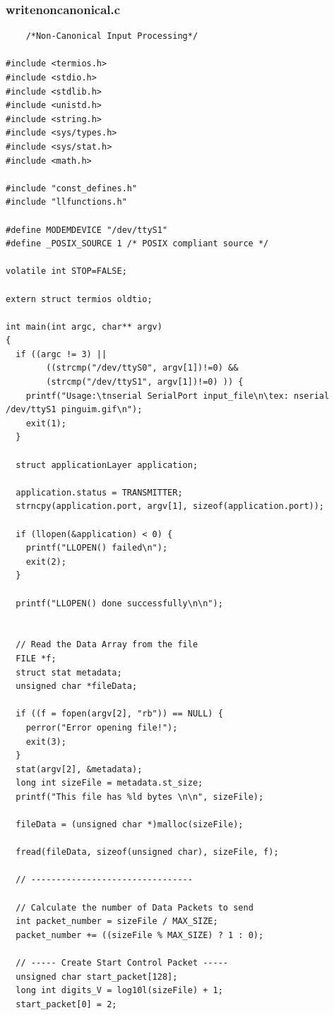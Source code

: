 \documentclass[article, a4paper, 11pt, oneside]{memoir}
\begin{document}
\subsubsection{writenoncanonical.c}
\begin{lstlisting}
	/*Non-Canonical Input Processing*/

#include <termios.h>
#include <stdio.h>
#include <stdlib.h>
#include <unistd.h>
#include <string.h>
#include <sys/types.h>
#include <sys/stat.h>
#include <math.h>
       
#include "const_defines.h"
#include "llfunctions.h"

#define MODEMDEVICE "/dev/ttyS1"
#define _POSIX_SOURCE 1 /* POSIX compliant source */

volatile int STOP=FALSE;

extern struct termios oldtio;

int main(int argc, char** argv)
{ 
  if ((argc != 3) || 
        ((strcmp("/dev/ttyS0", argv[1])!=0) && 
        (strcmp("/dev/ttyS1", argv[1])!=0) )) {
    printf("Usage:\tnserial SerialPort input_file\n\tex: nserial /dev/ttyS1 pinguim.gif\n"); 
    exit(1);
  }

  struct applicationLayer application;

  application.status = TRANSMITTER;
  strncpy(application.port, argv[1], sizeof(application.port));

  if (llopen(&application) < 0) {
    printf("LLOPEN() failed\n");
    exit(2);
  }
  
  printf("LLOPEN() done successfully\n\n");


  // Read the Data Array from the file
  FILE *f;
  struct stat metadata;
  unsigned char *fileData;

  if ((f = fopen(argv[2], "rb")) == NULL) {
    perror("Error opening file!");
    exit(3);
  }
  stat(argv[2], &metadata);
  long int sizeFile = metadata.st_size;
  printf("This file has %ld bytes \n\n", sizeFile);

  fileData = (unsigned char *)malloc(sizeFile);

  fread(fileData, sizeof(unsigned char), sizeFile, f);

  // --------------------------------

  // Calculate the number of Data Packets to send
  int packet_number = sizeFile / MAX_SIZE;
  packet_number += ((sizeFile % MAX_SIZE) ? 1 : 0);

  // ----- Create Start Control Packet -----
  unsigned char start_packet[128];
  long int digits_V = log10l(sizeFile) + 1;
  start_packet[0] = 2;


\end{lstlisting}
\end{document}
